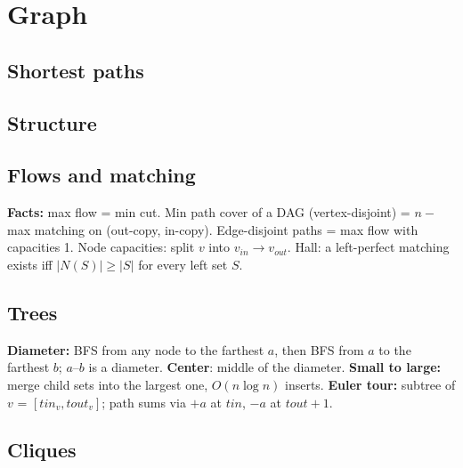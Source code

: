 \chapter{Graph}

\section{Shortest paths}

\section{Structure}

\section{Flows and matching}
	\textbf{Facts:} max flow = min cut. Min path cover of a DAG (vertex-disjoint) =
	$n -$ max matching on (out-copy, in-copy). Edge-disjoint paths = max flow with
	capacities 1. Node capacities: split $v$ into $v_{in} \to v_{out}$.
	Hall: a left-perfect matching exists iff $|N(S)| \ge |S|$ for every left set $S$.

\section{Trees}
	\textbf{Diameter:} BFS from any node to the farthest $a$, then BFS from $a$
	to the farthest $b$; $a$--$b$ is a diameter. \textbf{Center}: middle of the diameter.
	\textbf{Small to large:} merge child sets into the largest one, $O(n \log n)$ inserts.
	\textbf{Euler tour:} subtree of $v$ = $[tin_v, tout_v]$; path sums via $+a$ at $tin$, $-a$ at $tout+1$.

\ifkactladvanced
\section{Cliques}
\fi
